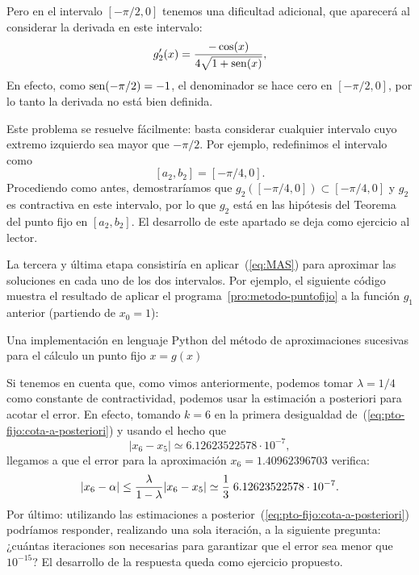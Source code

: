 \begin{example}
\begin{itemize}
    Pero en el intervalo $[-\pi/2,0]$ tenemos una dificultad
    adicional, que aparecerá al considerar la derivada en este
    intervalo:
    $$
      g_2'(x)=\frac{-\cos(x)}{4\sqrt{1+\operatorname{sen}(x)}},
    $$
    En efecto, como $\operatorname{sen}(-\pi/2)=-1$, el denominador se hace cero en
    $[-\pi/2,0]$, por lo tanto la derivada no está bien definida.

    Este problema se resuelve fácilmente: basta considerar cualquier
    intervalo cuyo extremo izquierdo sea mayor que $-\pi/2$. Por
    ejemplo, redefinimos el intervalo como
    $$[a_2,b_2]=[-\pi/4,0].$$
    Procediendo como antes, demostraríamos que
    $g_2([-\pi/4,0])\subset[-\pi/4,0]$ y $g_2$ es contractiva en este
    intervalo, por lo que $g_2$ está en las hipótesis del Teorema del
    punto fijo en $[a_2,b_2]$. El desarrollo de este apartado se deja
    como ejercicio al lector.
  \end{itemize}
  La \textsf{tercera y última etapa} consistiría en
  aplicar~(\ref{eq:MAS}) para aproximar las soluciones en cada uno de
  los dos intervalos. Por ejemplo, el siguiente código muestra el
  resultado de aplicar el programa~\ref{pro:metodo-puntofijo}
  a la función $g_1$ anterior (partiendo de $x_0=1$):
  \begin{pythonoutput}
  \end{pythonoutput}
  \label{ex:punto-fijo-1}
  \begin{program}
    \caption{Una implementación en lenguaje Python del método de
      aproximaciones sucesivas para el cálculo un punto fijo $x=g(x)$}
    \label{pro:metodo-puntofijo}
  \end{program}

  Si tenemos en cuenta que, como vimos anteriormente, podemos tomar
  $\lambda=1/4$ como constante de contractividad, podemos usar la
  estimación a posteriori para acotar el error. En efecto, tomando
  $k=6$ en la primera desigualdad
  de~(\ref{eq:pto-fijo:cota-a-posteriori}) y usando el hecho que
  $$
  |x_{6}-x_{5}| \simeq 6.12623522578 \cdot 10^{-7},
  $$
  llegamos a que el error para la aproximación $x_6=1.40962396703$ verifica:
  $$
  |x_6-\alpha| \le \frac{\lambda}{1-\lambda}
  |x_6-x_{5}|
  \simeq \frac{1}{3}\; 6.12623522578 \cdot 10^{-7}.
  $$
  Por último: utilizando las estimaciones a
  posterior~(\ref{eq:pto-fijo:cota-a-posteriori}) podríamos responder,
  realizando una sola iteración, a la siguiente pregunta: ¿cuántas
  iteraciones son necesarias para garantizar que el error sea menor que
  $10^{-15}$? El desarrollo de la respuesta queda como ejercicio
  propuesto.
\end{example}


